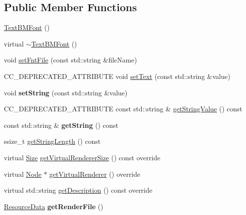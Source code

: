 \subsection*{Public Member Functions}
\begin{DoxyCompactItemize}
\item 
\hyperlink{classui_1_1TextBMFont_a1dd2e9b92ea5a445e1a7512485a06cfe}{Text\+B\+M\+Font} ()
\item 
virtual \hyperlink{classui_1_1TextBMFont_a9f11d8304e4972f177587c05c294f689}{$\sim$\+Text\+B\+M\+Font} ()
\item 
void \hyperlink{classui_1_1TextBMFont_adaef5e07e587002487250c639a51f4e8}{set\+Fnt\+File} (const std\+::string \&file\+Name)
\item 
C\+C\+\_\+\+D\+E\+P\+R\+E\+C\+A\+T\+E\+D\+\_\+\+A\+T\+T\+R\+I\+B\+U\+TE void \hyperlink{classui_1_1TextBMFont_a7709799981f60b2586798726a674946f}{set\+Text} (const std\+::string \&value)
\item 
\mbox{\label{classui_1_1TextBMFont_af99dab9559041d10486eee8c2cdd1933}} 
void {\bfseries set\+String} (const std\+::string \&value)
\item 
C\+C\+\_\+\+D\+E\+P\+R\+E\+C\+A\+T\+E\+D\+\_\+\+A\+T\+T\+R\+I\+B\+U\+TE const std\+::string \& \hyperlink{classui_1_1TextBMFont_acad372a897b448f298d708dfca2d4997}{get\+String\+Value} () const
\item 
\mbox{\label{classui_1_1TextBMFont_a6c089f6de89d3244b290301735281e4d}} 
const std\+::string \& {\bfseries get\+String} () const
\item 
ssize\+\_\+t \hyperlink{classui_1_1TextBMFont_adcae15f2ec3e20f18834b3e5afb3de37}{get\+String\+Length} () const
\item 
virtual \hyperlink{classSize}{Size} \hyperlink{classui_1_1TextBMFont_a8fb5c5f091852376a0060487c1981943}{get\+Virtual\+Renderer\+Size} () const override
\item 
virtual \hyperlink{classNode}{Node} $\ast$ \hyperlink{classui_1_1TextBMFont_ac9d8900e87de50e47d330bf4cf3dece1}{get\+Virtual\+Renderer} () override
\item 
virtual std\+::string \hyperlink{classui_1_1TextBMFont_ad0de7ec80e5ef916d147a77390e89aba}{get\+Description} () const override
\item 
\mbox{\label{classui_1_1TextBMFont_a4759af679f1c5091b6d0d9c04363be78}} 
\hyperlink{structResourceData}{Resource\+Data} {\bfseries get\+Render\+File} ()

\end{DoxyCompactItemize}
